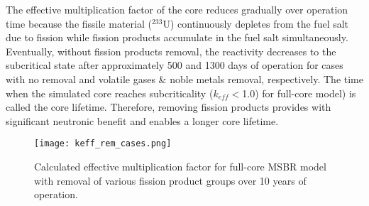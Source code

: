 The effective multiplication factor of the core reduces gradually over 
operation time because the fissile material ($^{233}$U) continuously depletes 
from the fuel salt due to fission while fission products 
accumulate in the fuel salt simultaneously. Eventually, without fission products removal, 
the reactivity decreases to the subcritical state after approximately 500 and 
1300 days of operation for cases with no removal and volatile gases \& noble 
metals removal, respectively. The time when the simulated core reaches 
subcriticality ($k_{eff}<$1.0) for full-core model) is called the core lifetime. 
Therefore, removing fission products provides with significant neutronic benefit 
and enables a longer core lifetime.
\begin{figure}[ht!] %
  \centering
  \texttt{[image: keff\_rem\_cases.png]} 
  \caption{Calculated effective multiplication factor for full-core \gls{MSBR} 
model with removal of various fission product groups over 10 years of 
operation.}
  \label{fig:fp_removal}
\end{figure}
